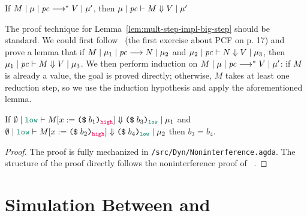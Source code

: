 \begin{lemma}
  \label{lem:mult-step-impl-big-step}
  If ${M}\mid{\mu}\mid{\ensuremath{\mathit{pc}}}\longrightarrow^{*}{V}\mid{\mu'}$, then ${\mu}\mid{\ensuremath{\mathit{pc}}}\vdash{M}\Downarrow{V}\mid{\mu'}$
\end{lemma}

\noindent The proof technique for Lemma~\ref{lem:mult-step-impl-big-step} should
be standard. We could first follow~\textcite{Streicher:2006aa} (the first
exercise about PCF on p. 17) and prove a lemma that if
${M}\mid{\mu_1}\mid{\ensuremath{\mathit{pc}}}\longrightarrow{N}\mid{\mu_2}$ and ${\mu_2}\mid{\ensuremath{\mathit{pc}}}\vdash{N}\Downarrow{V}\mid{\mu_3}$, then
${\mu_1}\mid{\ensuremath{\mathit{pc}}}\vdash{M}\Downarrow{V}\mid{\mu_3}$. We then perform induction on
${M}\mid{\mu}\mid{\ensuremath{\mathit{pc}}}\longrightarrow^{*}{V}\mid{\mu'}$: if $M$ is already a value, the goal is
proved directly; otherwise, $M$ takes at least one reduction step, so we use the
induction hypothesis and apply the aforementioned lemma.

\begin{lemma}
\label{lem:NI-old}
If
$\bigstep{\emptyset}{\low}{M [ x := \dynconst{b_1}{\high}]}{\dynconst{b_3}{\low}}{\mu_1}$
and
$\bigstep{\emptyset}{\low}{M [ x := \dynconst{b_2}{\high}]}{\dynconst{b_4}{\low}}{\mu_2}$
then $b_3 = b_4$.
\end{lemma}
\begin{proof}
The proof is fully mechanized in \texttt{/src/Dyn/Noninterference.agda}. The
structure of the proof directly follows the noninterference proof of
\CCOld~\parencite{Chen:2022aa}.
\end{proof}

\section{Simulation Between \CC and \DynIFC}
\label{sec:sim-cc-dynifc}

